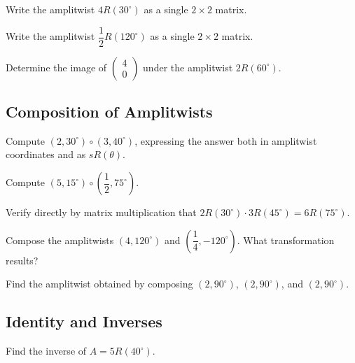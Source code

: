 \begin{exercise}
Write the amplitwist $4R(30^\circ)$ as a single $2\times2$ matrix.
\end{exercise}

\begin{exercise}
Write the amplitwist $\dfrac12 R(120^\circ)$ as a single $2\times2$
matrix.
\end{exercise}

\begin{exercise}
Determine the image of $\begin{pmatrix} 4\\ 0 \end{pmatrix}$ under the
amplitwist $2R(60^\circ)$.
\end{exercise}

\subsection*{Composition of Amplitwists}
\begin{exercise}
Compute $(2,30^\circ)\circ(3,40^\circ)$, expressing the answer both in
amplitwist coordinates and as $sR(\theta)$.
\end{exercise}

\begin{exercise}
Compute $(5,15^\circ)\circ\left(\dfrac12,75^\circ\right)$.
\end{exercise}

\begin{exercise}
Verify directly by matrix multiplication that $2R(30^\circ)\cdot
3R(45^\circ) = 6R(75^\circ)$.
\end{exercise}

\begin{exercise}
Compose the amplitwists $(4,120^\circ)$ and $\left(\dfrac14,
-120^\circ\right)$. What transformation results?
\end{exercise}

\begin{exercise}
Find the amplitwist obtained by composing $(2,90^\circ)$,
$(2,90^\circ)$, and $(2,90^\circ)$.
\end{exercise}

\subsection*{Identity and Inverses}
\begin{exercise}
Find the inverse of $A = 5R(40^\circ)$.
\end{exercise}


